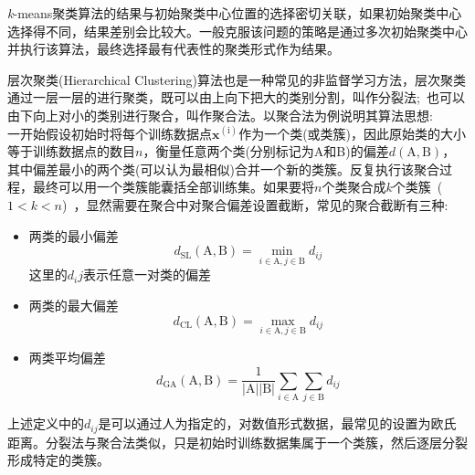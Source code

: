 \textit{k}-\textrm{means}聚类算法的结果与初始聚类中心位置的选择密切关联，如果初始聚类中心选择得不同，结果差别会比较大。一般克服该问题的策略是通过多次初始聚类中心并执行该算法，最终选择最有代表性的聚类形式作为结果。

层次聚类(\textrm{Hierarchical Clustering})算法也是一种常见的非监督学习方法，层次聚类通过一层一层的进行聚类，既可以由上向下把大的类别分割，叫作分裂法;~也可以由下向上对小的类别进行聚合，叫作聚合法。以聚合法为例说明其算法思想:\\
一开始假设初始时将每个训练数据点$\mathbf{x}^{(\mathrm{i})}$作为一个类(或类簇)，因此原始类的大小等于训练数据点的数目$n$，衡量任意两个类(分别标记为\textrm{A}和\textrm{B})的偏差$d(\mathrm{A},\mathrm{B})$，其中偏差最小的两个类(可以认为最相似)合并一个新的类簇。反复执行该聚合过程，最终可以用一个类簇能囊括全部训练集。如果要将$n$个类聚合成$k$个类簇~($1<k<n$)~，显然需要在聚合中对聚合偏差设置截断，常见的聚合截断有三种:
\begin{itemize}
	\item 两类的最小偏差
\begin{displaymath}
	d_{\mathrm{SL}}(\mathrm{A},\mathrm{B})=\min\limits_{i\in\mathrm{A},j\in\mathrm{B}}d_{ij}
\end{displaymath}
这里的$d_ij$表示任意一对类的偏差
	\item 两类的最大偏差
\begin{displaymath}
	d_{\mathrm{CL}}(\mathrm{A},\mathrm{B})=\max\limits_{i\in\mathrm{A},j\in\mathrm{B}}d_{ij}
\end{displaymath}
	\item 两类平均偏差
\begin{displaymath}
	d_{\mathrm{GA}}(\mathrm{A},\mathrm{B})=\dfrac1{|\mathrm{A}||\mathrm{B}|}\sum\limits_{i\in\mathrm{A}}\sum\limits_{j\in\mathrm{B}}d_{ij}
\end{displaymath}
\end{itemize}
上述定义中的$d_{ij}$是可以通过人为指定的，对数值形式数据，最常见的设置为欧氏距离。分裂法与聚合法类似，只是初始时训练数据集属于一个类簇，然后逐层分裂形成特定的类簇。

